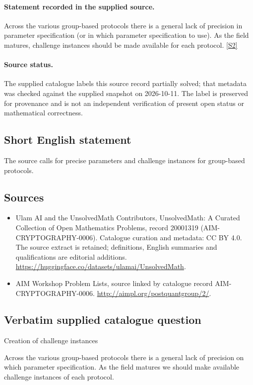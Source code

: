 \documentclass[11pt]{article}
\begin{document}
\paragraph{Statement recorded in the supplied source.}
Across the various group-based protocols there is a general lack of precision in parameter specification (or in which parameter specification to use). As the field matures, challenge instances should be made available for each protocol. \href{http://aimpl.org/postquantgroup/2/}{[S2]}
\paragraph{Source status.}
The supplied catalogue labels this source record partially solved; that metadata was checked against the supplied snapshot on 2026-10-11. The label is preserved for provenance and is not an independent verification of present open status or mathematical correctness.
\subsection{Short English statement}
The source calls for precise parameters and challenge instances for group-based protocols.
\subsection{Sources}
\begin{itemize}
\item[S1] Ulam AI and the UnsolvedMath Contributors, UnsolvedMath: A Curated Collection of Open Mathematics Problems, record 20001319 (AIM-CRYPTOGRAPHY-0006). Catalogue curation and metadata: CC BY 4.0. The source extract is retained; definitions, English summaries and qualifications are editorial additions.
\url{https://huggingface.co/datasets/ulamai/UnsolvedMath}.
\item[S2] AIM Workshop Problem Lists, source linked by catalogue record AIM-CRYPTOGRAPHY-0006.
\url{http://aimpl.org/postquantgroup/2/}.
\end{itemize}
\subsection{Verbatim supplied catalogue question}
Creation of challenge instances

Across the various group-based protocols there is a general lack of precision on which parameter specification. As the field matures we should make available challenge instances of each protocol.
\end{document}
